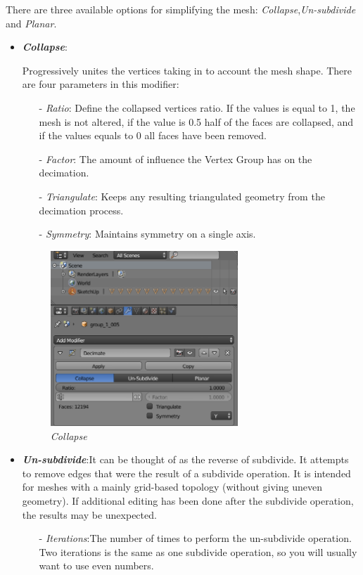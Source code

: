 		There are three available options for simplifying the mesh: \textit{Collapse},\textit{Un-subdivide} and \textit{Planar}.
		\begin{itemize}
			\item \textbf{\textit{Collapse}}:
			
			Progressively unites the vertices taking in to account the mesh shape. There are four parameters in this modifier:
			\begin{itemize}
				\item [-] \textit{Ratio}: Define the collapsed vertices ratio. If the values is equal to 1, the mesh is not altered, if the value is 0.5 half of the faces are collapsed, and if the values equals to 0 all faces have been removed.
				\item [-] \textit{Factor}: The amount of influence the Vertex Group has on the decimation.
				\item [-] \textit{Triangulate}: Keeps any resulting triangulated geometry from the decimation process.
				\item [-] \textit{Symmetry}: Maintains symmetry on a single axis.
			\end{itemize}
		\begin{figure}[!ht]
			\centering
			\includegraphics[width=200pt]{figuras/hillblendermod.png}
			\caption{\textit{\textit{Collapse}}}
			\label{collapse}
		\end{figure}
		\item \textbf{\textit{Un-subdivide}}:It can be thought of as the reverse of subdivide. It attempts to remove edges that were the result of a subdivide operation. It is intended for meshes with a mainly grid-based topology (without giving uneven geometry). If additional editing has been done after the subdivide operation, the results may be unexpected.
		\begin{itemize}
			\item [-] \textit{Iterations}:The number of times to perform the un-subdivide operation. Two iterations is the same as one subdivide operation, so you will usually want to use even numbers.

\end{itemize}
\end{itemize}
